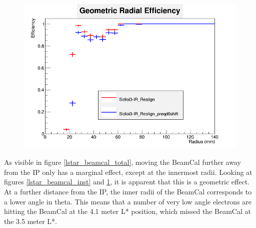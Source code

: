 \documentclass{report}
\begin{document}
                \begin{figure}[H]
                    \includegraphics[width=\textwidth]{RadialEfficiencyFP_geometric}
                    \centering
                    \caption{}
                    \label{lstar_beamcal_geom}
                \end{figure}

                As visible in figure \ref{lstar_beamcal_total}, moving the BeamCal further away from the IP only has a marginal effect, except at the innermost radii. Looking at figures \ref{lstar_beamcal_inst} and \ref{lstar_beamcal_geom}, it is apparent that this is a geometric effect. At a further distance from the IP, the inner radii of the BeamCal corresponds to a lower angle in theta. This means that a number of very low angle electrons are hitting the BeamCal at the 4.1 meter L* position, which missed the BeamCal at the 3.5 meter L*.
                
\end{document}

